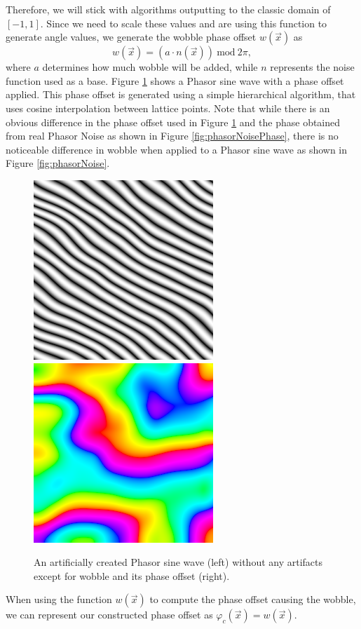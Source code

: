 \documentclass{utue} %
\begin{document}
Therefore, we will stick with algorithms outputting to the classic domain of $[-1,1]$. Since we need to scale these values and are using this function to generate angle values, we generate the wobble phase offset $w(\vec{x})$ as
$$
w(\vec{x}) = (a\cdot n(\vec{x}))\ \mathrm{mod}\ 2\pi,
$$
where $a$ determines how much wobble will be added, while $n$ represents the noise function used as a base. Figure \ref{fig:wobble} shows a Phasor sine wave with a phase offset applied. This phase offset is generated using a simple hierarchical algorithm, that uses cosine interpolation between lattice points. Note that while there is an obvious difference in the phase offset used in Figure \ref{fig:wobble} and the phase obtained from real Phasor Noise as shown in Figure \ref{fig:phasorNoisePhase}, there is no noticeable difference in wobble when applied to a Phasor sine wave as shown in Figure \ref{fig:phasorNoise}.
\begin{figure}[h]
  \centering
  \includegraphics[width=0.49\linewidth]{images/wobble}
  \includegraphics[width=0.49\linewidth]{images/wobblePhase}
  \caption{An artificially created Phasor sine wave (left) without any artifacts except for wobble and its phase offset (right).}\label{fig:wobble}
\end{figure}
When using the function $w(\vec{x})$ to compute the phase offset causing the wobble, we can represent our constructed phase offset as $\varphi_c(\vec{x}) = w(\vec{x})$.
\end{document}

